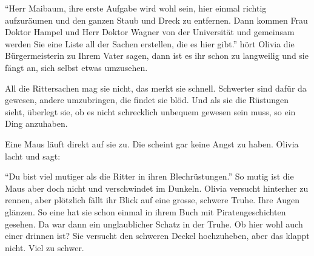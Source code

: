 \enquote{Herr Maibaum, ihre erste Aufgabe wird wohl sein, hier einmal richtig aufzuräumen und den ganzen Staub und Dreck zu entfernen. Dann kommen Frau Doktor Hampel und Herr Doktor Wagner von der Universität und gemeinsam werden Sie eine Liste all der Sachen erstellen, die es hier gibt.} hört Olivia die Bürgermeisterin zu Ihrem Vater sagen, dann ist es ihr schon zu langweilig und sie fängt an, sich selbst etwas umzusehen.

All die Rittersachen mag sie nicht, das merkt sie schnell. Schwerter sind dafür da gewesen, andere umzubringen, die findet sie blöd. Und als sie die Rüstungen sieht, überlegt sie, ob es nicht schrecklich unbequem gewesen sein muss, so ein Ding anzuhaben. 

Eine Maus läuft direkt auf sie zu. Die scheint gar keine Angst zu haben. Olivia lacht und sagt:

\enquote{Du bist viel mutiger als die Ritter in ihren Blechrüstungen.} So mutig ist die Maus aber doch nicht und verschwindet im Dunkeln. Olivia versucht hinterher zu rennen, aber plötzlich fällt ihr Blick auf eine grosse, schwere Truhe. Ihre Augen glänzen. So eine hat sie schon einmal in ihrem Buch mit Piratengeschichten gesehen. Da war dann ein unglaublicher Schatz in der Truhe. Ob hier wohl auch einer drinnen ist? Sie versucht den schweren Deckel hochzuheben, aber das klappt nicht. Viel zu schwer. 

